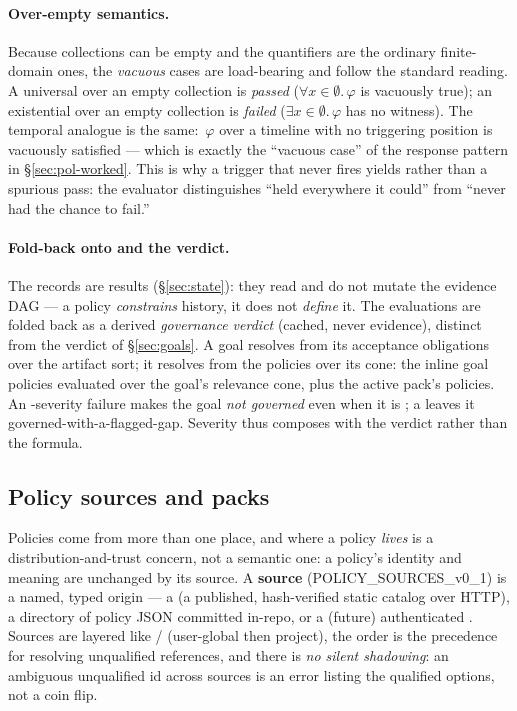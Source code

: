 \paragraph{Over-empty semantics.}
Because collections can be empty and the quantifiers are the ordinary
finite-domain ones, the \emph{vacuous} cases are load-bearing and follow the
standard reading. A universal over an empty collection is \emph{passed}
(\(\forall x \in \emptyset.\,\varphi\) is vacuously true); an existential over an
empty collection is \emph{failed} (\(\exists x \in \emptyset.\,\varphi\) has no
witness). The temporal analogue is the same: \,\(\varphi\) over a timeline
with no triggering position is vacuously satisfied --- which is exactly the
``vacuous case'' of the response pattern in \S\ref{sec:pol-worked}. This is why a
trigger that never fires yields  rather than a spurious pass:
the evaluator distinguishes ``held everywhere it could'' from ``never had the
chance to fail.''

\paragraph{Fold-back onto \trace{} and the  verdict.}
The  records are  results
(\S\ref{sec:state}): they read \trace{} and do not mutate the evidence DAG --- a
policy \emph{constrains} history, it does not \emph{define} it. The evaluations
are folded back as a derived \emph{governance verdict} (cached, never evidence),
distinct from the  verdict of \S\ref{sec:goals}. A goal resolves
 from its acceptance obligations over the artifact sort; it resolves
 from the policies over its cone: the inline goal policies
evaluated over the goal's relevance cone, plus the active pack's policies. An
-severity failure makes the goal \emph{not governed} even when it is
; a  leaves it governed-with-a-flagged-gap. Severity thus
composes with the verdict rather than the formula.

\subsection{Policy sources and packs}\label{sec:pol-sources}

Policies come from more than one place, and where a policy \emph{lives} is a
distribution-and-trust concern, not a semantic one: a policy's identity and
meaning are unchanged by its source. A \textbf{source}
(POLICY\_SOURCES\_v0\_1) is a named, typed origin --- a  (a
published, hash-verified static catalog over HTTP), a  directory of
policy JSON committed in-repo, or a (future) authenticated . Sources
are layered like / (user-global then project), the
order is the precedence for resolving unqualified references, and there is
\emph{no silent shadowing}: an ambiguous unqualified id across sources is an
error listing the qualified options, not a coin flip.

